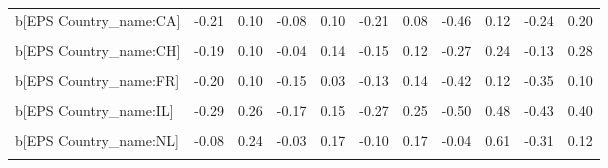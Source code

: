 \begin{table}
\begin{tabular}[t]{lrrrrrrrrrr}
b[EPS Country\_name:CA] & -0.21 & 0.10 & -0.08 & 0.10 & -0.21 & 0.08 & -0.46 & 0.12 & -0.24 & 0.20\\
\cellcolor{gray!10}{b[(Intercept) Country\_name:CH]} & \cellcolor{gray!10}{-0.50} & \cellcolor{gray!10}{0.38} & \cellcolor{gray!10}{-0.21} & \cellcolor{gray!10}{0.33} & \cellcolor{gray!10}{-0.42} & \cellcolor{gray!10}{0.37} & \cellcolor{gray!10}{-0.75} & \cellcolor{gray!10}{0.79} & \cellcolor{gray!10}{-0.53} & \cellcolor{gray!10}{0.74}\\
b[EPS Country\_name:CH] & -0.19 & 0.10 & -0.04 & 0.14 & -0.15 & 0.12 & -0.27 & 0.24 & -0.13 & 0.28\\
\cellcolor{gray!10}{b[(Intercept) Country\_name:FR]} & \cellcolor{gray!10}{-0.54} & \cellcolor{gray!10}{0.41} & \cellcolor{gray!10}{-0.31} & \cellcolor{gray!10}{0.20} & \cellcolor{gray!10}{-0.39} & \cellcolor{gray!10}{0.40} & \cellcolor{gray!10}{-0.98} & \cellcolor{gray!10}{0.64} & \cellcolor{gray!10}{-0.82} & \cellcolor{gray!10}{0.51}\\
b[EPS Country\_name:FR] & -0.20 & 0.10 & -0.15 & 0.03 & -0.13 & 0.14 & -0.42 & 0.12 & -0.35 & 0.10\\
\cellcolor{gray!10}{b[(Intercept) Country\_name:IL]} & \cellcolor{gray!10}{-0.56} & \cellcolor{gray!10}{0.43} & \cellcolor{gray!10}{-0.27} & \cellcolor{gray!10}{0.28} & \cellcolor{gray!10}{-0.46} & \cellcolor{gray!10}{0.40} & \cellcolor{gray!10}{-0.99} & \cellcolor{gray!10}{0.70} & \cellcolor{gray!10}{-0.76} & \cellcolor{gray!10}{0.65}\\
b[EPS Country\_name:IL] & -0.29 & 0.26 & -0.17 & 0.15 & -0.27 & 0.25 & -0.50 & 0.48 & -0.43 & 0.40\\
\cellcolor{gray!10}{b[(Intercept) Country\_name:NL]} & \cellcolor{gray!10}{-0.31} & \cellcolor{gray!10}{0.58} & \cellcolor{gray!10}{-0.19} & \cellcolor{gray!10}{0.37} & \cellcolor{gray!10}{-0.31} & \cellcolor{gray!10}{0.42} & \cellcolor{gray!10}{-0.51} & \cellcolor{gray!10}{1.40} & \cellcolor{gray!10}{-0.72} & \cellcolor{gray!10}{0.43}\\
b[EPS Country\_name:NL] & -0.08 & 0.24 & -0.03 & 0.17 & -0.10 & 0.17 & -0.04 & 0.61 & -0.31 & 0.12\\
\cellcolor{gray!10}{b[(Intercept) Country\_name:SE]} & \cellcolor{gray!10}{-0.62} & \cellcolor{gray!10}{0.34} & \cellcolor{gray!10}{-0.32} & \cellcolor{gray!10}{0.20} & \cellcolor{gray!10}{-0.68} & \cellcolor{gray!10}{0.28} & \cellcolor{gray!10}{-0.86} & \cellcolor{gray!10}{0.63} & \cellcolor{gray!10}{-0.39} & \cellcolor{gray!10}{1.09}\\

\end{tabular}
\end{table}
